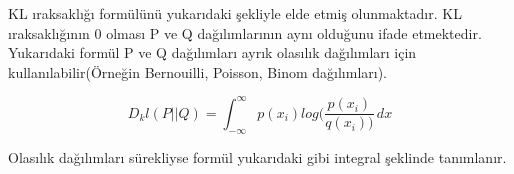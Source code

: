 \documentclass[12pt, a4paper]{article}
\begin{document}
			KL ıraksaklığı formülünü yukarıdaki şekliyle elde etmiş olunmaktadır. KL ıraksaklığının 0 olması P ve Q dağılımlarının aynı olduğunu ifade etmektedir. Yukarıdaki formül P ve Q dağılımları ayrık olasılık dağılımları için kullanılabilir(Örneğin Bernouilli, Poisson, Binom dağılımları).
		
				\begin {center}
			\begin{equation}D_kl(P||Q) =    \int_{-\infty}^{\infty}p(x_i)log(\frac{p(x_i)}{q(x_i))}\,dx \label{eqn: Olasılık dağılımları ayrıkken Kullback-Leibler Iraksaklığı}		\end{equation}
			\end {center}
			Olasılık dağılımları sürekliyse formül yukarıdaki gibi integral şeklinde tanımlanır.
			
			
\end{document}
